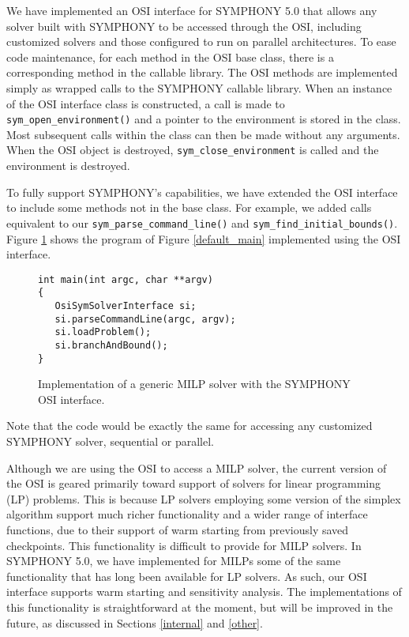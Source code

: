 We have implemented an OSI interface for SYMPHONY 5.0 that allows any solver
built with SYMPHONY to be accessed through the OSI, including customized
solvers and those configured to run on parallel architectures. To ease code
maintenance, for each method in the OSI base class, there is a corresponding
method in the callable library. The OSI methods are implemented simply as
wrapped calls to the SYMPHONY callable library. When an instance of the OSI
interface class is constructed, a call is made to
\texttt{sym\_open\_environment()} and a pointer to the environment is stored
in the class. Most subsequent calls within the class can then be made without
any arguments. When the OSI object is destroyed,
\texttt{sym\_close\_environment} is called and the environment is destroyed.

To fully support SYMPHONY's capabilities, we have extended the OSI interface to
include some methods not in the base class. For example, we added calls
equivalent to our \texttt{sym\_parse\_command\_line()} and
\texttt{sym\_find\_initial\_bounds()}. Figure \ref{OSI_main} shows the
program of Figure \ref{default_main} implemented using the OSI interface.
\begin{figure}[tb]
\begin{Verbatim}[frame=lines]
int main(int argc, char **argv)
{
   OsiSymSolverInterface si;
   si.parseCommandLine(argc, argv);
   si.loadProblem();
   si.branchAndBound();
}
\end{Verbatim}
\caption{Implementation of a generic MILP solver with the SYMPHONY
OSI interface. \label{OSI_main}}
\end{figure}
Note that the code would be exactly the same for accessing any customized
SYMPHONY solver, sequential or parallel.

Although we are using the OSI to access a MILP solver, the current version of
the OSI is geared primarily toward support of solvers for linear programming
(LP) problems. This is because LP solvers employing some version of the
simplex algorithm support much richer functionality and a wider range of
interface functions, due to their support of warm starting from previously
saved checkpoints. This functionality is difficult to provide for MILP
solvers.  In SYMPHONY 5.0, we have implemented for MILPs some of the same
functionality that has long been available for LP solvers. As such, our OSI
interface supports warm starting and sensitivity analysis. The implementations
of this functionality is straightforward at the moment, but will be improved
in the future, as discussed in Sections \ref{internal} and
\ref{other}.

